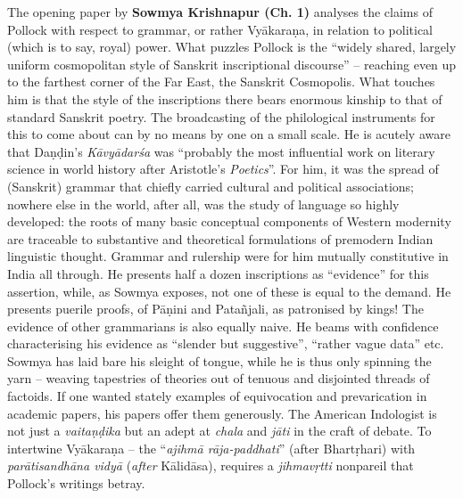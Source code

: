 The opening paper by {\bf Sowmya Krishnapur (Ch. 1)} analyses the claims of Pollock with respect to grammar, or rather Vyākaraṇa, in relation to political (which is to say, royal) power. What puzzles Pollock is the “widely shared, largely uniform cosmopolitan style of Sanskrit inscriptional discourse” -- reaching even up to the farthest corner of the Far East, the Sanskrit Cosmopolis. What touches him is that the style of the inscriptions there bears enormous kinship to that of standard Sanskrit poetry. The broadcasting of the philological instruments for this to come about can by no means by one on a small scale. He is acutely aware that Daṇḍin’s {\sl Kāvyādarśa} was “probably the most influential work on literary science in world history after Aristotle’s {\sl Poetics}”. For him, it was the spread of (Sanskrit) grammar that chiefly carried cultural and political associations; nowhere else in the world, after all, was the study of language so highly developed: the roots of many basic conceptual components of Western modernity are traceable to substantive and theoretical formulations of premodern Indian linguistic thought. Grammar and rulership were for him mutually constitutive in India all through. He presents half a dozen inscriptions as “evidence” for this assertion, while, as Sowmya exposes, not one of these is equal to the demand. He presents puerile proofs, of Pāṇini and Patañjali, as patronised by kings! The evidence of other grammarians is also equally naive. He beams with confidence characterising his evidence as “slender but suggestive”, “rather vague data” etc. Sowmya has laid bare his sleight of tongue, while he is thus only spinning the yarn – weaving tapestries of theories out of tenuous and disjointed threads of factoids. If one wanted stately examples of equivocation and prevarication in academic papers, his papers offer them generously. The American Indologist is not just a {\sl vaitaṇḍika} but an adept at {\sl chala} and {\sl jāti} in the craft of debate. To intertwine Vyākaraṇa -- the “{\sl ajihmā rāja-paddhati}” (after Bhartṛhari) with {\sl parātisandhāna vidyā} ({\sl after} Kālidāsa), requires a {\sl jihmavṛtti} nonpareil that Pollock’s writings betray.

